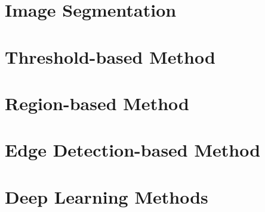 \section{Image Segmentation}

\section{Threshold-based Method}

\section{Region-based Method}

\section{Edge Detection-based Method}

\section{Deep Learning Methods}








